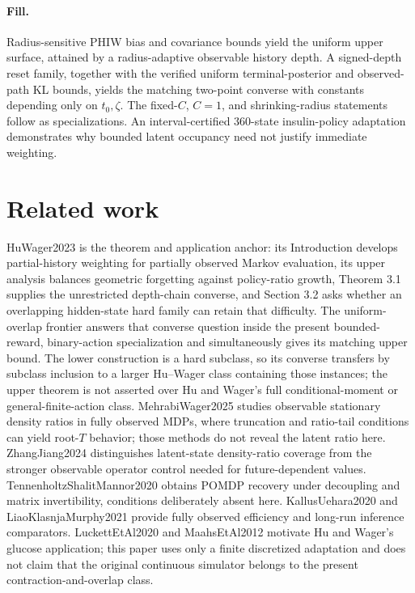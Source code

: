 \documentclass{article}
\begin{document}
\paragraph{Fill.} Radius-sensitive PHIW bias and covariance bounds yield the uniform upper surface, attained by a radius-adaptive observable history depth. A signed-depth reset family, together with the verified uniform terminal-posterior and observed-path KL bounds, yields the matching two-point converse with constants depending only on \(t_0,\zeta\). The fixed-\(C\), \(C=1\), and shrinking-radius statements follow as specializations. An interval-certified \(360\)-state insulin-policy adaptation demonstrates why bounded latent occupancy need not justify immediate weighting.

\section{Related work}

HuWager2023 is the theorem and application anchor: its Introduction develops partial-history weighting for partially observed Markov evaluation, its upper analysis balances geometric forgetting against policy-ratio growth, Theorem 3.1 supplies the unrestricted depth-chain converse, and Section 3.2 asks whether an overlapping hidden-state hard family can retain that difficulty. The uniform-overlap frontier answers that converse question inside the present bounded-reward, binary-action specialization and simultaneously gives its matching upper bound. The lower construction is a hard subclass, so its converse transfers by subclass inclusion to a larger Hu--Wager class containing those instances; the upper theorem is not asserted over Hu and Wager's full conditional-moment or general-finite-action class. MehrabiWager2025 studies observable stationary density ratios in fully observed MDPs, where truncation and ratio-tail conditions can yield root-\(T\) behavior; those methods do not reveal the latent ratio here. ZhangJiang2024 distinguishes latent-state density-ratio coverage from the stronger observable operator control needed for future-dependent values. TennenholtzShalitMannor2020 obtains POMDP recovery under decoupling and matrix invertibility, conditions deliberately absent here. KallusUehara2020 and LiaoKlasnjaMurphy2021 provide fully observed efficiency and long-run inference comparators. LuckettEtAl2020 and MaahsEtAl2012 motivate Hu and Wager's glucose application; this paper uses only a finite discretized adaptation and does not claim that the original continuous simulator belongs to the present contraction-and-overlap class.
\end{document}
